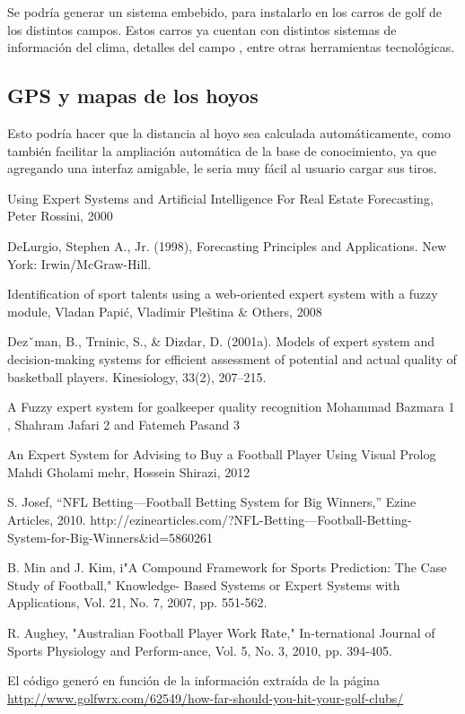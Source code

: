 \documentclass[runningheads,a4paper]{llncs}
\begin{document}
  Se podría generar un sistema embebido, para instalarlo en los carros de golf de
  los distintos campos. Estos carros ya cuentan con distintos sistemas de
  información del clima, detalles del campo , entre otras herramientas
  tecnológicas. 

\subsection{GPS y mapas de los hoyos}

  Esto podría hacer que la distancia al hoyo sea calculada automáticamente, como
  también facilitar la ampliación automática de la base de conocimiento, ya que
  agregando una interfaz amigable, le seria muy fácil al usuario cargar sus
  tiros.


\begin{thebibliography}{7}

   Using Expert Systems and Artificial Intelligence For Real
    Estate Forecasting, Peter Rossini, 2000

   DeLurgio, Stephen A., Jr. (1998), Forecasting Principles and
    Applications. New York: Irwin/McGraw-Hill. 

   Identification of  sport talents using a web-oriented
    expert  system  with  a fuzzy module, Vladan  Papić, Vladimir Pleština \&
    Others, 2008

   Dezˇman, B., Trninic, S., \& Dizdar, D. (2001a). Models
    of expert system and decision-making systems for efficient assessment of
    potential and actual quality of basketball players. Kinesiology, 33(2),
    207–215.

   A Fuzzy expert system for goalkeeper quality recognition
    Mohammad Bazmara 1 , Shahram Jafari 2 and Fatemeh Pasand 3

   An Expert System for Advising to Buy a Football
  Player Using Visual Prolog
  Mahdi Gholami mehr, Hossein Shirazi, 2012

   S. Josef, “NFL Betting—Football Betting System for Big
    Winners,” Ezine Articles, 2010.
    http://ezinearticles.com/?NFL-Betting---Football-Betting-
    System-for-Big-Winners\&id=5860261

   B. Min and J. Kim, i"A Compound Framework for Sports
    Prediction: The Case Study of Football," Knowledge-
    Based Systems or Expert Systems with Applications, Vol.
    21, No. 7, 2007, pp. 551-562.

   R. Aughey, "Australian Football Player Work Rate,"
    In-ternational Journal of Sports Physiology and Perform-ance, Vol. 5, No.
    3, 2010, pp. 394-405.
    
   El código generó en función de la información extraída
    de la página
    \url{http://www.golfwrx.com/62549/how-far-should-you-hit-your-golf-clubs/}

\end{thebibliography}
\end{document}
